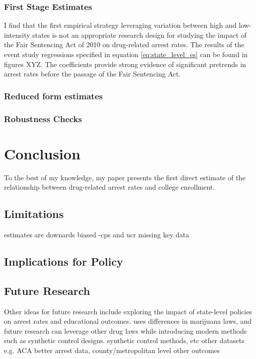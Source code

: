 \documentclass{article}
\begin{document}
\subsubsection{First Stage Estimates}

I find that the first empirical strategy leveraging variation between high and low-intensity states is not an appropriate research design for studying the impact of the Fair Sentencing Act of 2010 on drug-related arrest rates. The results of the event study regressions specified in equation \ref{eq:state_level_es} can be found in figures XYZ. The coefficients provide strong evidence of significant pretrends in arrest rates before the passage of the Fair Sentencing Act.

\subsubsection{Reduced form estimates}

\subsubsection{Robustness Checks}

\section{Conclusion}

To the best of my knowledge, my paper presents the first direct estimate of the relationship between drug-related arrest rates and college enrollment.

\subsection{Limitations}

estimates are downards biased -cps and ucr missing key data

\subsection{Implications for Policy}

\subsection{Future Research}

Other ideas for future research include exploring the impact of state-level policies on arrest rates and educational outcomes. \cite{britton2022} uses differences in marijuana laws, and future research can leverage other drug laws while introducing modern methods such as synthetic control designs.
synthetic control methods, etc
other datasets e.g. ACA
better arrest data, county/metropolitan level
other outcomes
\end{document}
